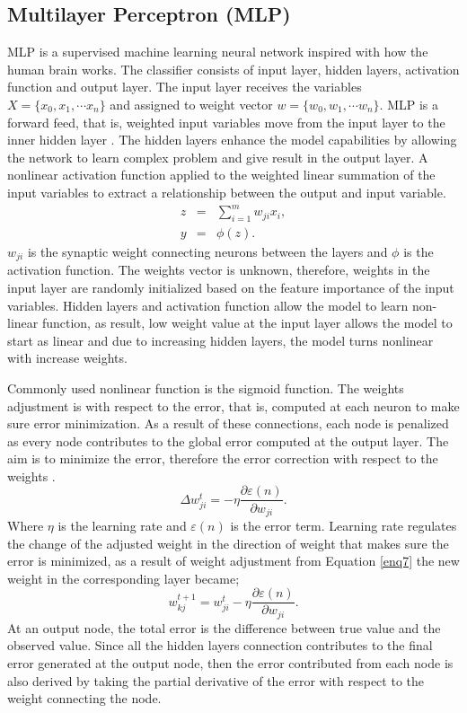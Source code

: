 \documentclass[final,5p,times,twocolumn,authoryear]{elsarticle}
\begin{document}
\subsection{Multilayer Perceptron (MLP)}\label{MLP}

MLP is a supervised machine learning neural network inspired with how the human brain works. The classifier consists of input layer, hidden layers, activation function and output layer. The input layer receives the variables $X =\{ x_{0}, x_{1},\cdots x_{n}\}$ and assigned to weight vector $ w = \{ w_{0}, w_{1}, \cdots w_{n}\}$. MLP is a forward feed, that is,  weighted input variables  move from the input layer to the inner hidden layer \cite{aggarwal2014data}. The hidden layers enhance the model capabilities by allowing the network to learn complex  problem and give result in the output layer. A nonlinear activation function applied to the weighted linear summation of the input variables to extract a relationship between the output and input variable.
\begin{eqnarray}
z  &=& \sum_{i=1}^{m} w_{ji}x_{i},\\
y &= & \phi(z).
\end{eqnarray}
 $w_{ji}$ is the synaptic weight connecting neurons between the layers and $\phi$ is the activation function.  
The weights vector is unknown, therefore, weights in the input layer are randomly initialized based on the feature importance of the input variables. Hidden layers and activation function allow the model to learn non-linear function, as result, low weight value at the input layer allows the model to start as linear and due to increasing hidden layers,  the model turns nonlinear with increase weights.

Commonly used nonlinear function is the sigmoid function. The weights adjustment is with respect to the error, that is, computed at each neuron to make sure error minimization. As a result of these connections, each node is penalized as every node contributes to the global error computed at the output layer. The aim is to minimize the error, therefore the error correction with respect to the weights  \cite{haykin2004comprehensive} . 
\begin{equation}\label{enq7}
\Delta w_{ji}^{t} =- \eta\frac{\partial \varepsilon(n)}{\partial w_{ji}}.
\end{equation}
Where $\eta$ is the learning rate and $\varepsilon(n)$ is the error term. Learning rate regulates the change of the adjusted weight in the direction of weight that makes sure the error is minimized, as a result of weight adjustment from Equation \eqref{enq7} the new weight in the corresponding layer became;
\begin{equation}
 w_{kj}^{t +1} =w_{ji}^{t}- \eta\frac{\partial \varepsilon(n)}{\partial w_{ji}}.
\end{equation}
   At an output node, the total error is the difference between true value and the observed value. Since all the hidden layers connection contributes to the final error generated at the output node, then the error contributed from each node is also derived by taking the partial derivative of the error with respect to the weight connecting the node.
\end{document}
